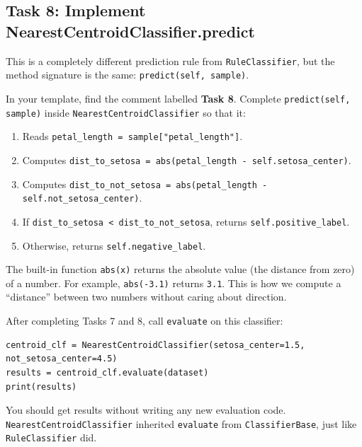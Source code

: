 \subsection{Task 8: Implement NearestCentroidClassifier.predict}

\begin{tcolorbox}[title=Task 8: Implement NearestCentroidClassifier.predict]
This is a completely different prediction rule from \texttt{RuleClassifier}, but the method signature is the same: \texttt{predict(self, sample)}.

\medskip
\noindent
In your template, find the comment labelled \textbf{Task 8}.
Complete \texttt{predict(self, sample)} inside \texttt{NearestCentroidClassifier} so that it:
\begin{enumerate}
    \item Reads \texttt{petal\_length = sample["petal\_length"]}.
    \item Computes \texttt{dist\_to\_setosa = abs(petal\_length - self.setosa\_center)}.
    \item Computes \texttt{dist\_to\_not\_setosa = abs(petal\_length - self.not\_setosa\_center)}.
    \item If \texttt{dist\_to\_setosa < dist\_to\_not\_setosa}, returns \texttt{self.positive\_label}.
    \item Otherwise, returns \texttt{self.negative\_label}.
\end{enumerate}
\end{tcolorbox}

\noindent
The built-in function \texttt{abs(x)} returns the absolute value (the distance from zero) of a number.
For example, \texttt{abs(-3.1)} returns \texttt{3.1}.
This is how we compute a ``distance'' between two numbers without caring about direction.

\begin{tcolorbox}[title=Checkpoint]
After completing Tasks 7 and 8, call \texttt{evaluate} on this classifier:
\begin{verbatim}
centroid_clf = NearestCentroidClassifier(setosa_center=1.5, not_setosa_center=4.5)
results = centroid_clf.evaluate(dataset)
print(results)
\end{verbatim}

\noindent
You should get results without writing any new evaluation code.
\texttt{NearestCentroidClassifier} inherited \texttt{evaluate} from \texttt{ClassifierBase}, just like \texttt{RuleClassifier} did.
\end{tcolorbox}

